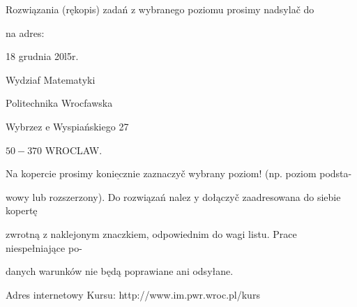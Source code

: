 \documentclass[a4paper,12pt]{article}
\begin{document}
Rozwiązania (rękopis) zadań z wybranego poziomu prosimy nadsylač do

na adres:

18 grudnia 20l5r.

Wydziaf Matematyki

Politechnika Wrocfawska

Wybrzez $\mathrm{e}$ Wyspiańskiego 27

$50-370$ WROCLAW.

Na kopercie prosimy $\underline{\mathrm{k}\mathrm{o}\mathrm{n}\mathrm{i}\mathrm{e}\mathrm{c}\mathrm{z}\mathrm{n}\mathrm{i}\mathrm{e}}$ zaznaczyč wybrany poziom! (np. poziom podsta-

wowy lub rozszerzony). Do rozwiązań nalez $\mathrm{y}$ dołączyč zaadresowana do siebie kopertę

zwrotną $\mathrm{z}$ naklejonym znaczkiem, odpowiednim do wagi listu. Prace niespełniające po-

danych warunków nie będą poprawiane ani odsyłane.

Adres internetowy Kursu: http://www.im.pwr.wroc.pl/kurs
\end{document}
